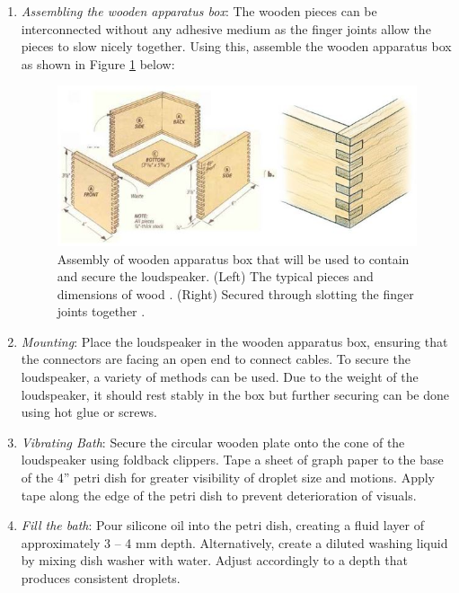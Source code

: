 \begin{enumerate}

\item \textit{Assembling the wooden apparatus box}: The wooden pieces can be interconnected without any adhesive medium as the finger joints allow the pieces to slow nicely together. Using this, assemble the wooden apparatus box as shown in Figure \ref{fig:WoodenBox} below:

\begin{figure}[h]
    \centering
    \includegraphics[width=\textwidth]{prototype/WoodenBox.jpg}
    \caption{Assembly of wooden apparatus box that will be used to contain and secure the loudspeaker. (Left) The typical pieces and dimensions of wood \cite{boxdimensions}. (Right)  Secured through slotting the finger joints together \cite{fingerjoints}.}
    \label{fig:WoodenBox}
\end{figure}

\item  \textit{Mounting}: Place the loudspeaker in the wooden apparatus box, ensuring that the connectors are facing an open end to connect cables. To secure the loudspeaker, a variety of methods can be used. Due to the weight of the loudspeaker, it should rest stably in the box but further securing can be done using hot glue or screws.

\item  \textit{Vibrating Bath}: Secure the circular wooden plate onto the cone of the loudspeaker using foldback clippers. Tape a sheet of graph paper to the base of the 4” petri dish for greater visibility of droplet size and motions. Apply tape along the edge of the petri dish to prevent deterioration of visuals.

\item  \textit{Fill the bath}: Pour silicone oil into the petri dish, creating a fluid layer of approximately 3 – 4 mm depth. Alternatively, create a diluted washing liquid by mixing dish washer with water. Adjust accordingly to a depth that produces consistent droplets.


\end{enumerate}
